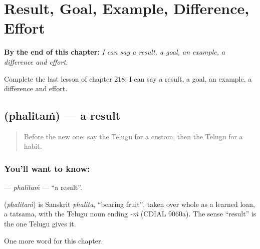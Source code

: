 
\chapter{Result, Goal, Example, Difference, Effort}
\label{ch:te-result-goal-example-difference-effort}

\begin{chapteropening}
\textbf{By the end of this chapter:} \emph{I can say a result, a goal, an example, a difference and effort.}

Complete the last lesson of chapter 218: I can say a result, a goal, an example, a difference and effort.
\end{chapteropening}

\section[\texorpdfstring{\te{ఫలితం} (phalitaṁ)}{ఫలితం (phalitaṁ)}]{ (phalitaṁ) — a result}

\label{lesson:TE-C218-phalitam}



\begin{quote}
Before the new one: say the Telugu for a custom, then the Telugu for a habit.
\end{quote}

\subsection*{You'll want to know: }
\textbf{} — \emph{phalitaṁ} — \textquotedblleft{}a result\textquotedblright{}.

\begin{cousinweb}
\textbf{} (\emph{phalitaṁ}) is Sanskrit \emph{phalita}, \textquotedblleft{}bearing fruit\textquotedblright{}, taken over whole as a learned loan, a tatsama, with the Telugu noun ending \emph{-ṁ} (CDIAL 9060a). The sense \textquotedblleft{}result\textquotedblright{} is the one Telugu gives it.
\end{cousinweb}

\begin{grammarlens}[title={What you've built}]
One more word for this chapter.
\end{grammarlens}

